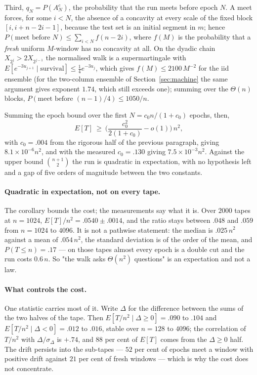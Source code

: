 \documentclass[11pt]{article}
\begin{document}
Third, $q_N=P(A_N^c)$, the probability that the run meets before epoch $N$. A meet forces, for some
$i<N$, the absence of a concavity at every scale of the fixed block $[i,i+n-2i-1]$, because the test
set is an initial segment in $m$; hence $P(\text{meet before }N)\le\sum_{i<N}f(n-2i)$, where $f(M)$ is
the probability that a \emph{fresh} uniform $M$-window has no concavity at all. On the dyadic chain
$X_{2^j}>2X_{2^{j-1}}$ the normalised walk is a supermartingale with
$E[e^{-3u_{j+1}}\mid\text{survival}]\le\frac14e^{-3u_j}$, which gives $f(M)\le2100\,M^{-2}$ for the iid ensemble (for the two-column ensemble of
Section~\ref{sec:machine} the same argument gives exponent $1.74$, which still exceeds one); summing
over the $\Theta(n)$ blocks, $P(\text{meet before }(n-1)/4)\le1050/n$.

Summing the epoch bound over the first $N=c_0n/(1+c_0)$ epochs, then,
\[
E[T]\ \ge\ \Big(\frac{c_0^2}{2(1+c_0)}-o(1)\Big)\,n^2 ,
\]
with $c_0=.004$ from the rigorous half of the previous paragraph, giving $8.1\times10^{-6}n^2$, and
with the measured $c_0=.130$ giving $7.5\times10^{-3}n^2$. Against the upper bound $\binom{n+1}{2}$
the run is quadratic in expectation, with no hypothesis left and a gap of five orders of magnitude
between the two constants.

\paragraph{Quadratic in expectation, not on every tape.} The corollary bounds the cost; the
measurements say what it is. Over $2000$ tapes at $n=1024$, $E[T]/n^2=.0540\pm.0014$, and the ratio
stays between $.048$ and $.059$ from $n=1024$ to $4096$. It is not a pathwise statement: the median
is $.025\,n^2$ against a mean of $.054\,n^2$, the standard deviation is of the order of the mean, and
$P(T\le n)=.17$ --- on those tapes almost every epoch is a double cut and the run costs $0.6\,n$. So
"the walk asks $\Theta(n^2)$ questions" is an expectation and not a law.

\paragraph{What controls the cost.} One statistic carries most of it. Write $\Delta$ for the
difference between the sums of the two halves of the tape. Then $E[T/n^2\mid\Delta\ge0]=.090$ to
$.104$ and $E[T/n^2\mid\Delta<0]=.012$ to $.016$, stable over $n=128$ to $4096$; the correlation of
$T/n^2$ with $\Delta/\sigma_\Delta$ is $+.74$, and $88$ per cent of $E[T]$ comes from the
$\Delta\ge0$ half. The drift persists into the sub-tapes --- $52$ per cent of epochs meet a window
with positive drift against $21$ per cent of fresh windows --- which is why the cost does not
concentrate.
\end{document}
